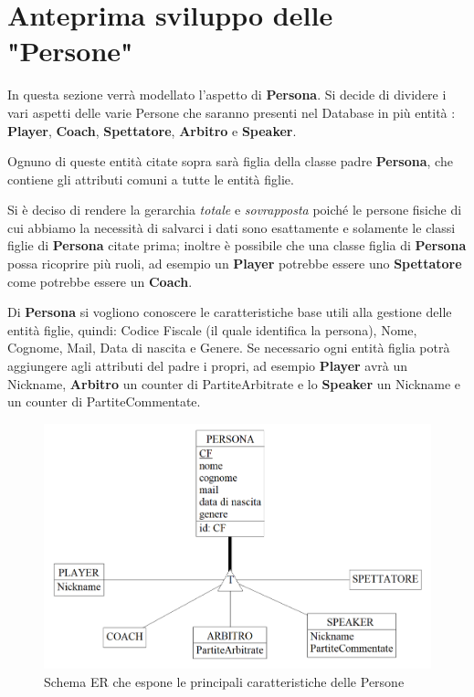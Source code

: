 \documentclass[a4paper,12pt]{report}
\begin{document}
\section{Anteprima sviluppo delle "Persone"}
In questa sezione verrà modellato l'aspetto di \textbf{Persona}. Si decide di dividere i vari aspetti delle varie Persone che saranno presenti nel Database in più entità : \textbf{Player}, \textbf{Coach}, \textbf{Spettatore}, \textbf{Arbitro} e \textbf{Speaker}.

Ognuno di queste entità citate sopra sarà figlia della classe padre \textbf{Persona}, che contiene gli attributi comuni a tutte le entità figlie.

Si è deciso di rendere la gerarchia \textit{totale} e \textit{sovrapposta} poiché le persone fisiche di cui abbiamo la necessità di salvarci i dati sono esattamente e solamente le classi figlie di \textbf{Persona} citate prima; inoltre è possibile che una classe figlia di \textbf{Persona} possa ricoprire più ruoli, ad esempio un \textbf{Player} potrebbe essere uno \textbf{Spettatore} come potrebbe essere un \textbf{Coach}.

Di \textbf{Persona} si vogliono conoscere le caratteristiche base utili alla gestione delle entità figlie, quindi: Codice Fiscale (il quale identifica la persona), Nome, Cognome, Mail, Data di nascita e Genere.
Se necessario ogni entità figlia potrà aggiungere agli attributi del padre i propri, ad esempio \textbf{Player} avrà un Nickname, \textbf{Arbitro} un counter di PartiteArbitrate e lo \textbf{Speaker} un Nickname e un counter di PartiteCommentate.

\begin{figure}[!htb]
	\centerline{\includegraphics[scale=0.5]{img/ER_Persona.png}}
	\caption{Schema ER che espone le principali caratteristiche delle Persone}
	\label{img:ER_Persona}
\end{figure}
\end{document}
